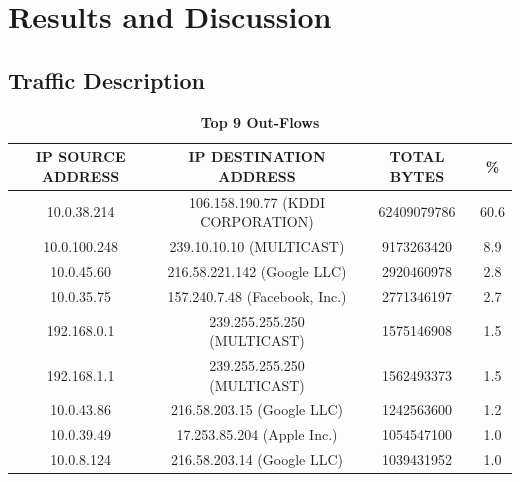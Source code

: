 \documentclass[journal]{IEEE/IEEEtran}
\begin{document}
\section{Results and Discussion}

\subsection{Traffic Description}

\begin{table}[ht]
\centering
\caption{\textbf{Top 9 Out-Flows}}
\label{top-out-flows}
\begin{tabular}{|c|c|c|c|}
\hline
\textbf{IP SOURCE ADDRESS} & \textbf{IP DESTINATION ADDRESS} 	& \textbf{TOTAL BYTES} 	& \textbf{\%} \\ \hline
    10.0.38.214		       & 106.158.190.77 (KDDI CORPORATION)  &  62409079786			& 60.6        \\ \hline
    10.0.100.248           & 239.10.10.10 (MULTICAST)			&  9173263420           & 8.9         \\ \hline
    10.0.45.60      	   & 216.58.221.142 (Google LLC)		&  2920460978           & 2.8         \\ \hline
    10.0.35.75             & 157.240.7.48 (Facebook, Inc.)		&  2771346197           & 2.7         \\ \hline
    192.168.0.1            & 239.255.255.250 (MULTICAST)		&  1575146908           & 1.5         \\ \hline
    192.168.1.1            & 239.255.255.250 (MULTICAST)		&  1562493373           & 1.5         \\ \hline
    10.0.43.86             & 216.58.203.15 (Google LLC)			&  1242563600           & 1.2         \\ \hline
    10.0.39.49		   	   & 17.253.85.204 (Apple Inc.)			&  1054547100           & 1.0         \\ \hline
    10.0.8.124	           & 216.58.203.14 (Google LLC)			&  1039431952           & 1.0         \\ \hline
\end{tabular}
\end{table}
\end{document}

